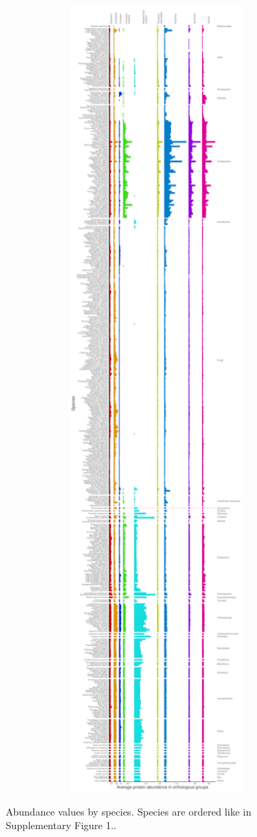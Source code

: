 \clearpage

\thispagestyle{empty}

\pdfpageheight=33in

\begin{figure}[p]

\caption{Abundance values by species. Species are ordered like in Supplementary Figure 1..}\label{fig:uncapped_abundances}

{\centering \includegraphics[height=31.5in, width=7in]{figs/analysis.abundance.uncapped_abundances-1} }

\end{figure}

